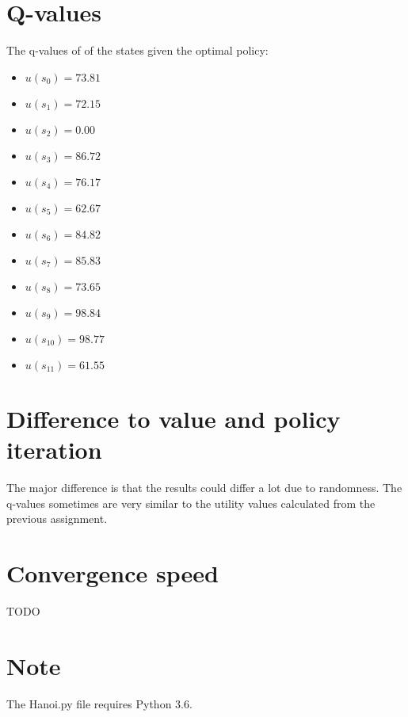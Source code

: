 \documentclass[a4paper]{article}
\begin{document}
\section{Q-values}

The q-values of of the states given the optimal policy:
\begin{multicols}{2}
\begin{itemize}
\item $u(s_0) = 73.81 $
\item $u(s_1) = 72.15 $
\item $u(s_2) = 0.00 $
\item $u(s_3) = 86.72 $
\item $u(s_4) = 76.17 $
\item $u(s_5) = 62.67 $
\item $u(s_6) = 84.82 $
\item $u(s_7) = 85.83 $
\item $u(s_8) = 73.65 $
\item $u(s_9) = 98.84 $
\item $u(s_{10}) = 98.77 $
\item $u(s_{11}) = 61.55 $
\end{itemize}
\end{multicols}

\section{Difference to value and policy iteration}
The major difference is that the results could differ a lot due to randomness. The q-values sometimes are very similar to the utility values calculated from the previous assignment.

\section{Convergence speed}
TODO

\section{Note}
The Hanoi.py file requires Python 3.6.
\end{document}
